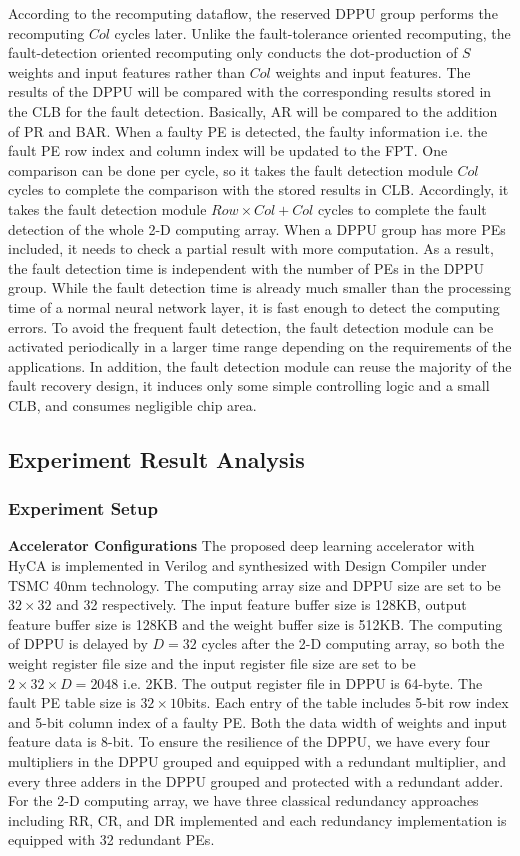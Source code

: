 According to the recomputing dataflow, the reserved DPPU group performs the recomputing $Col$ cycles later. Unlike the fault-tolerance oriented recomputing, the fault-detection oriented recomputing only conducts the dot-production of $S$ weights and input features rather than $Col$ weights and input features. The results of the DPPU will be compared with the corresponding results stored in the CLB for the fault detection. Basically, AR will be compared to the addition of PR and BAR. When a faulty PE is detected, the faulty information i.e. the fault PE row index and column index will be updated to the FPT. One comparison can be done per cycle, so it takes the fault detection module $Col$ cycles to complete the comparison with the stored results in CLB. Accordingly, it takes the fault detection module $Row \times Col + Col$ cycles to complete the fault detection of the whole 2-D computing array. When a DPPU group has more PEs included, it needs to check a partial result with more computation. As a result, the fault detection time is independent with the number of PEs in the DPPU group. While the fault detection time is already much smaller than the processing time of a normal neural network layer, it is fast enough to detect the computing errors. To avoid the frequent fault detection, the fault detection module can be activated periodically in a larger time range depending on the requirements of the applications. In addition, the fault detection module can reuse the majority of the fault recovery design, it induces only some simple controlling logic and a small CLB, and consumes negligible chip area.

\subsection{Experiment Result Analysis}
\subsubsection{Experiment Setup}
\textbf{Accelerator Configurations} The proposed deep learning accelerator with HyCA is implemented in Verilog and synthesized with Design Compiler under TSMC 40nm technology. The computing array size and DPPU size are set to be $32\times 32$ and 32 respectively. The input feature buffer size is 128KB, output feature buffer size is 128KB and the weight buffer size is 512KB. The computing of DPPU is delayed by $D=32$ cycles after the 2-D computing array, so both the weight register file size and the input register file size are set to be $2 \times 32 \times D = 2048$ i.e. 2KB. The output register file in DPPU is 64-byte. The fault PE table size is $32 \times 10$bits. Each entry of the table includes 5-bit row index and 5-bit column index of a faulty PE. Both the data width of weights and input feature data is 8-bit. To ensure the resilience of the DPPU, we have every four multipliers in the DPPU grouped and equipped with a redundant multiplier, and every three adders in the DPPU grouped and protected with a redundant adder. For the 2-D computing array, we have three classical redundancy approaches including RR, CR, and DR implemented and each redundancy implementation is equipped with 32 redundant PEs.

